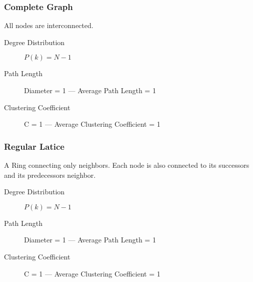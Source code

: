 	\subsubsection{Complete Graph} %
	\label{ssub:complete_graph}
	All nodes are interconnected.
		\begin{description}
			\item[Degree Distribution] $P(k) = N-1$
			\item[Path Length] Diameter = 1 --- Average Path Length = 1
			\item[Clustering Coefficient] C = 1 --- Average Clustering Coefficient = 1
		\end{description}

	\subsubsection*{Regular Latice} %
	\label{ssub:regular_latice}
	A Ring connecting only neighbors.
	Each node is also connected to its successors and its predecessors neighbor.
	\begin{description}
			\item[Degree Distribution] $P(k) = N-1$
			\item[Path Length] Diameter = 1 --- Average Path Length = 1
			\item[Clustering Coefficient] C = 1 --- Average Clustering Coefficient = 1
		\end{description}

